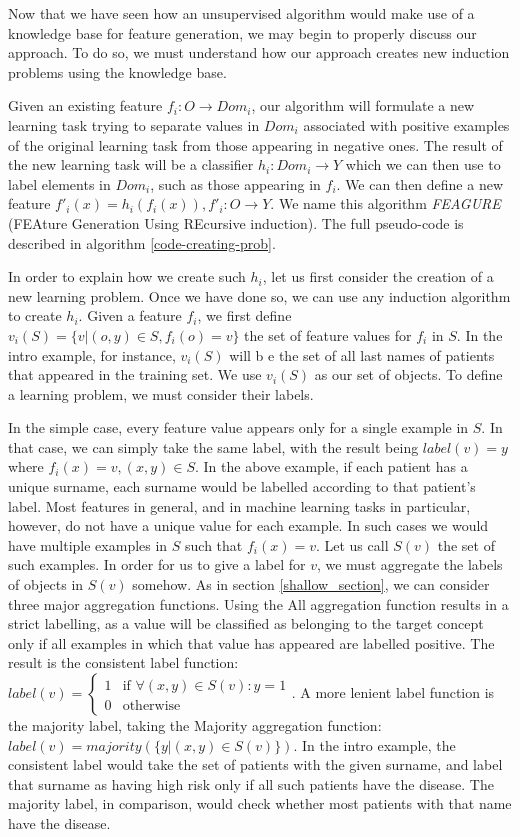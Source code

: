 \documentclass[twoside,11pt]{article}
\theoremstyle{definition}
\begin{document}
Now that we have seen how an unsupervised algorithm would make use of a knowledge base for feature generation, we may begin to properly discuss our approach. To do so, we must understand how our approach creates new induction problems using the knowledge base.

Given an existing feature $f_{i}:O\rightarrow Dom_i$, our algorithm will formulate a new learning task trying to separate values in $Dom_i$ associated with positive examples of the original learning task from those appearing in negative ones. The result of the new learning task will be a classifier
$h_{i}:Dom_{i}\rightarrow Y$ which we can then use to label elements in $Dom_i$, such as those appearing in $f_{i}$. We can then define a new feature $f'_{i}(x)=h_{i}(f_{i}(x)), f'_{i}:O\rightarrow Y$.
We name this algorithm \emph{FEAGURE} (FEAture Generation Using REcursive induction). The full pseudo-code is described in algorithm \ref{code-creating-prob}.

In order to explain how we create such $h_{i}$, let us first consider the creation of a new learning problem. Once we have done so, we can use any induction algorithm to create $h_i$. 
Given a feature $f_{i}$, we first define $v_i(S) = \{v | (o,y) \in S, f_{i}(o)=v\}$ the set of feature values for $f_i$ in $S$. In the intro example, for instance, $v_i(S)$ will b
e the set of all last names of patients that appeared in the training set.
We use $v_i(S)$ as our set of objects. To define a learning problem, we must consider their labels. 

In the simple case, every feature value appears only for a single example in $S$. In that case, we can simply take the same label, with the result being $label(v)=y$ where $f_i(x)=v,(x,y)\in S$. In the above example, if each patient has a unique surname, each surname would be labelled according to that patient's label.
Most features in general, and in machine learning tasks in particular, however, do not have a unique value for each example. In such cases we would have multiple examples in $S$ such that $f_i(x)=v$. Let us call $S(v)$ the set of such examples. In order for us to give a label for $v$, we must aggregate the labels of objects in $S(v)$ somehow. As in section \ref{shallow_section}, we can consider three major aggregation functions.
Using the All aggregation function results in a strict labelling, as a value will be classified as belonging to the target concept only if all examples in which that value has appeared are labelled positive. The result is the consistent label function: $label(v)=\begin{cases} 1 &\mbox{if } \forall (x,y)\in S(v): y=1\\ 
0 & \mbox{otherwise } \end{cases}$.
 A more lenient label function is the majority label, taking the Majority aggregation function: $label(v)=majority(\{y|(x,y)\in S(v)\})$.
 In the intro example, the consistent label would take the set of patients with the given surname, and label that surname as having high risk only if all such patients have the disease. The majority label, in comparison, would check whether most patients with that name have the disease.
 
\end{document}
